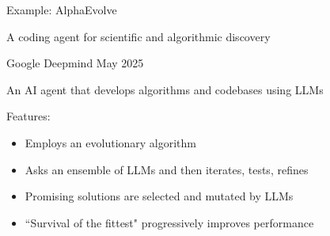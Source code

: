 \begin{frame}{Example: AlphaEvolve} 

    A coding agent for scientific and algorithmic discovery

    \begin{figure}
       \centering
    \end{figure}

    \begin{center}
        Google Deepmind May 2025
    \end{center}

\end{frame}

\begin{frame}
    
    An AI agent that develops algorithms and codebases using LLMs

        \vspace{0.5em}
        \vspace{0.5em}
        \vspace{0.5em}

    Features:

        \vspace{0.5em}

    \begin{itemize}
        \item Employs an evolutionary algorithm
        \vspace{0.5em}
        \item Asks an ensemble of LLMs and then iterates, tests, refines
        \vspace{0.5em}
        \item Promising solutions are selected and mutated by LLMs 
        \vspace{0.5em}
        \item ``Survival of the fittest" progressively improves performance
    \end{itemize}

\end{frame}

